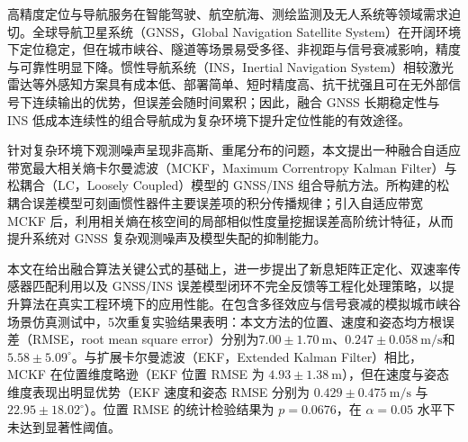 


\begin{cabstract}

  

  高精度定位与导航服务在智能驾驶、航空航海、测绘监测及无人系统等领域需求迫切。全球导航卫星系统（GNSS，Global Navigation Satellite System）在开阔环境下定位稳定，但在城市峡谷、隧道等场景易受多径、非视距与信号衰减影响，精度与可靠性明显下降。惯性导航系统（INS，Inertial Navigation System）相较激光雷达等外感知方案具有成本低、部署简单、短时精度高、抗干扰强且可在无外部信号下连续输出的优势，但误差会随时间累积；因此，融合 GNSS 长期稳定性与 INS 低成本连续性的组合导航成为复杂环境下提升定位性能的有效途径。


  针对复杂环境下观测噪声呈现非高斯、重尾分布的问题，本文提出一种融合自适应带宽最大相关熵卡尔曼滤波（MCKF，Maximum Correntropy Kalman Filter）与松耦合（LC，Loosely Coupled）模型的 GNSS/INS 组合导航方法。所构建的松耦合误差模型可刻画惯性器件主要误差项的积分传播规律；引入自适应带宽 MCKF 后，利用相关熵在核空间的局部相似性度量挖掘误差高阶统计特征，从而提升系统对 GNSS 复杂观测噪声及模型失配的抑制能力。


  本文在给出融合算法关键公式的基础上，进一步提出了新息矩阵正定化、双速率传感器匹配利用以及 GNSS/INS 误差模型闭环不完全反馈等工程化处理策略，以提升算法在真实工程环境下的应用性能。在包含多径效应与信号衰减的模拟城市峡谷场景仿真测试中，5次重复实验结果表明：本文方法的位置、速度和姿态均方根误差（RMSE，root mean square error）分别为$7.00\pm1.70~\mathrm{m}$、$0.247\pm0.058~\mathrm{m/s}$和$5.58\pm5.09^{\circ}$。与扩展卡尔曼滤波（EKF，Extended Kalman Filter）相比，MCKF 在位置维度略逊（EKF 位置 RMSE 为 $4.93\pm1.38~\mathrm{m}$），但在速度与姿态维度表现出明显优势（EKF 速度和姿态 RMSE 分别为 $0.429\pm0.475~\mathrm{m/s}$ 与 $22.95\pm18.02^{\circ}$）。位置 RMSE 的统计检验结果为 $p=0.0676$，在 $\alpha=0.05$ 水平下未达到显著性阈值。
  


\end{cabstract}

